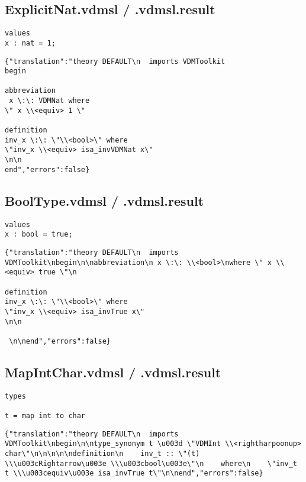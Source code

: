 \begin{appendices}
\subsection{ExplicitNat.vdmsl / .vdmsl.result}
\begin{lstlisting}
values
x : nat = 1;

\end{lstlisting}

\begin{lstlisting}
{"translation":"theory DEFAULT\n  imports VDMToolkit
begin

abbreviation
 x \:\: VDMNat where 
\" x \\<equiv> 1 \" 

definition
inv_x \:\: \"\\<bool>\" where
\"inv_x \\<equiv> isa_invVDMNat x\"
\n\n
end","errors":false}
\end{lstlisting}

\subsection{BoolType.vdmsl / .vdmsl.result}
\begin{lstlisting}
values
x : bool = true;

\end{lstlisting}

\begin{lstlisting}
{"translation":"theory DEFAULT\n  imports VDMToolkit\nbegin\n\nabbreviation\n x \:\: \\<bool>\nwhere \" x \\<equiv> true \"\n

definition
inv_x \:\: \"\\<bool>\" where
\"inv_x \\<equiv> isa_invTrue x\"
\n\n

 \n\nend","errors":false}
\end{lstlisting}

\subsection{MapIntChar.vdmsl / .vdmsl.result} \label{mapintchar}
\begin{lstlisting}
types

t = map int to char
\end{lstlisting}

\begin{lstlisting}
{"translation":"theory DEFAULT\n  imports VDMToolkit\nbegin\n\ntype_synonym t \u003d \"VDMInt \\<rightharpoonup> char\"\n\n\n\n\ndefinition\n    inv_t :: \"(t) \\\u003cRightarrow\u003e \\\u003cbool\u003e\"\n    where\n    \"inv_t t \\\u003cequiv\u003e isa_invTrue t\"\n\nend","errors":false}
\end{lstlisting}


\end{appendices}
